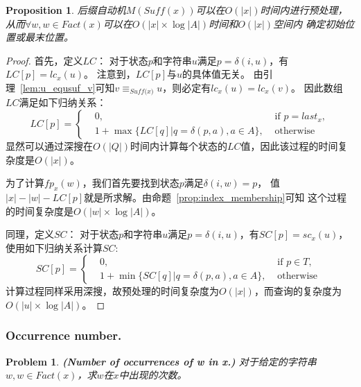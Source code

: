 \documentclass[UTF8]{ctexart}
\newtheorem{prop}[thm]{Proposition}
\newtheorem{prob}[thm]{Problem}
\theoremstyle{definition}
\theoremstyle{remark}
\numberwithin{equation}{subsection}
\newcommand{\Emph}{\textbf}
\newcommand{\equsuf}[1][x]{\equiv_{\textit{Suff(#1)}}}
\newcommand{\Suff}{\textit{Suff}}
\begin{document}
	\begin{prop}
		后缀自动机$M(\Suff(x))$可以在$O(|x|)$时间内进行预处理，
		从而$\forall w, w \in Fact(x)$可以在$O(|x| \times \log |A|)$时间和$O(|x|)$空间内
		确定初始位置或最末位置。
	\end{prop}
	\begin{proof}
		首先，定义$LC$：
		对于状态$p$和字符串$u$满足$p = \delta(i, u)$，有$LC[p] = lc_x(u)$。
		注意到，$LC[p]$与$u$的具体值无关。
		由引理~\ref{lem:u_equsuf_v}可知$v \equsuf[x] u$，则必定有$lc_x(u) = lc_x(v)$。
		因此数组$LC$满足如下归纳关系：
		\[
			LC[p] =
			\left\{
				\begin{aligned}
					&0,				&\text{ if } p = last_x,	\\
					&1 + \max \{ LC[q] | q = \delta(p, a), a \in A \}, &\text{ otherwise }
				\end{aligned}
			\right .
		\]
		显然可以通过深搜在$O(|Q|)$时间内计算每个状态的$LC$值，因此该过程的时间复杂度是$O(|x|)$。
		
		为了计算$fp_x(w)$，我们首先要找到状态$p$满足$\delta(i, w) = p$，
		值$|x| - |w| - LC[p]$就是所求解。由命题~\ref{prop:index_membership}可知
		这个过程的时间复杂度是$O(|w| \times \log |A|)$。
		
		同理，定义$SC$：
		对于状态$p$和字符串$u$满足$p = \delta(i, u)$，有$SC[p] = sc_x(u)$，使用如下归纳关系计算$SC$:
		\[
			SC[p] =
			\left\{
				\begin{aligned}
					&0,			&\text{ if } p \in T,	\\
					&1 + \min \{ SC[q] | q = \delta(p, a), a \in A \},	&\text{ otherwise }
				\end{aligned}
			\right .
		\]
		计算过程同样采用深搜，故预处理的时间复杂度为$O(|x|)$，而查询的复杂度为$O(|u| \times \log |A|)$。
		
	\end{proof}
	
\subsubsection{Occurrence number.}
\label{subsub:idx_on}

	\begin{prob}
		\Emph{(Number of occurrences of w in x.)}
		对于给定的字符串$w, w \in Fact(x)$，求$w$在$x$中出现的次数。
	\end{prob}
		
\end{document}
